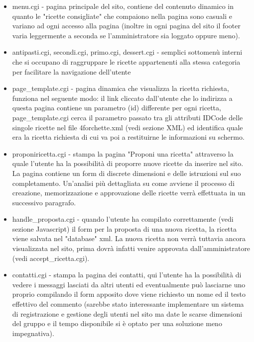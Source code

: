 \documentclass[12pt]{article}
\begin{document}
\begin{itemize}

				\item  menu.cgi - pagina principale del sito, contiene del contenuto dinamico in quanto le "ricette consigliate" che compaiono nella pagina sono casuali e variano ad ogni accesso alla pagina (inoltre in ogni pagina del sito il footer varia leggermente a seconda se l'amministratore sia loggato oppure meno).
				
				\item  antipasti.cgi, secondi.cgi, primo.cgi, dessert.cgi - semplici sottomen\`u interni che si occupano di raggruppare le ricette appartenenti alla stessa categoria per facilitare la navigazione dell'utente

				\item page\_template.cgi - pagina dinamica che visualizza la ricetta richiesta, funziona nel seguente modo: il link cliccato dall'utente che lo indirizza a questa pagina contiene un parametro (id) differente per ogni ricetta, page\_template.cgi cerca il parametro passato tra gli attributi IDCode delle singole ricette nel file 4forchette.xml (vedi sezione XML) ed identifica quale era la ricetta richiesta di cui va poi a restituirne le informazioni su schermo.

				\item proponiricetta.cgi - stampa la pagina "Proponi una ricetta" attraverso la quale l'utente ha la possibilit\`a di proporre nuove ricette da inserire nel sito. La pagina contiene un form di discrete dimensioni e delle istruzioni sul suo completamento. Un'analisi pi\`u dettagliata su come avviene il processo di creazione, memorizzazione e approvazione delle ricette verr\`a effettuata in un successivo paragrafo.

				\item handle\_proposta.cgi - quando l'utente ha compilato correttamente (vedi sezione Javascript) il form per la proposta di una nuova ricetta, la ricetta viene salvata nel "database" xml. La nuova ricetta non verr\`a tuttavia ancora visualizzata nel sito, prima dovr\`a infatti venire approvata dall'amministratore (vedi accept\_ricetta.cgi).

				\item contatti.cgi - stampa la pagina dei contatti, qui l'utente ha la possibilità di vedere i messaggi lasciati da altri utenti ed eventualmente pu\`o lasciarne uno proprio compilando il form apposito dove viene richiesto un nome ed il testo effettivo del commento (sarebbe stato interessante implementare un sistema di registrazione e gestione degli utenti nel sito ma date le scarse dimensioni del gruppo e il tempo disponibile si \`e optato per una soluzione meno impegnativa).


\end{itemize}
\end{document}
